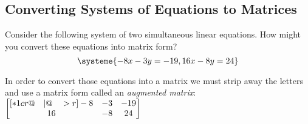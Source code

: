 \documentclass[12pt,tiks]{article}
\begin{document}
\vspace*{\fill}
\newpage
\clearpage
\thispagestyle{fancy}
\setcounter{page}{2}
    \subsection*{Converting Systems of Equations to Matrices}
       \begin{minipage}[t][.5in][t]{2.4in}\RaggedRight
        Consider the following system of two simultaneous linear equations. How might you convert these equations into matrix form?
            \begin{equation*}
              \systeme{
                      -8x-3y=-19,
                      16x-8y=24
                      }
            \end{equation*}
        \end{minipage}
        \hspace{.2in}
        \begin{minipage}[t][.5in][t]{2.4in}\RaggedRight
        In order to convert those equations into a matrix we must strip away the letters and use a matrix form called an \textit{augmented matrix}:
        \-\vspace*{.15in}
        $
            \begin{bmatrix}[*1cr@{\quad}|@{\quad}>{\color{black}}r]
              -8 & -3 & -19 \\
              16 & -8 & 24
            \end{bmatrix}
        $
        \end{minipage}
        
    \-\hspace*{\fill}
    \-\vspace*{1in}
\end{document}
